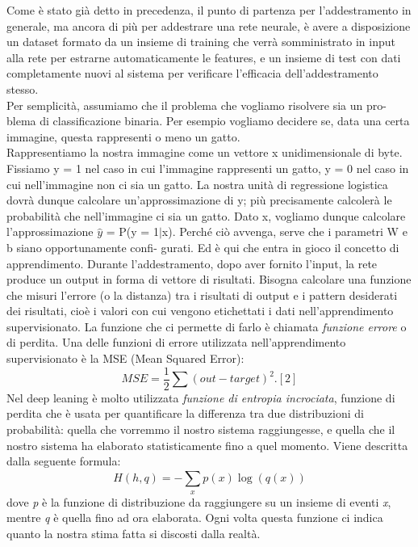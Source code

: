 Come è stato già detto in precedenza, il punto di partenza per l’addestramento in generale, ma ancora di più per addestrare una rete neurale, 
è avere a disposizione un dataset formato da un insieme di training che verrà somministrato in
 input alla rete per estrarne automaticamente le features, e un insieme di test con dati completamente nuovi al sistema
  per verificare l'efficacia dell’addestramento stesso. \\
  Per semplicità, assumiamo che il problema che vogliamo risolvere sia un pro-
blema di classificazione binaria. Per esempio vogliamo decidere se, data una certa
immagine, questa rappresenti o meno un gatto.\\
Rappresentiamo la nostra immagine come un vettore x unidimensionale di byte.
Fissiamo y = 1 nel caso in cui l’immagine rappresenti un gatto, y = 0 nel caso in
cui nell’immagine non ci sia un gatto. La nostra unità di regressione logistica dovrà
dunque calcolare un’approssimazione di y; più precisamente calcolerà le probabilità
che nell’immagine ci sia un gatto.
Dato x, vogliamo dunque calcolare l'approssimazione 
$\hat{y}$ = P(y = 1$\mid$x). 
Perché ciò avvenga, serve che i parametri W e b siano opportunamente confi-
gurati. Ed è qui che entra in gioco il concetto di apprendimento.
  Durante l’addestramento, dopo aver fornito l'input,
   la rete produce un output in forma di
vettore di risultati. Bisogna calcolare una funzione che misuri l’errore (o la distanza) tra i
 risultati di output e i pattern desiderati dei risultati, cioè i valori con cui vengono etichettati i 
 dati nell’apprendimento supervisionato.
  La funzione che ci permette di farlo è chiamata \emph{funzione errore} o di perdita.
   Una delle funzioni di errore utilizzata nell’apprendimento supervisionato è la MSE (Mean Squared Error):
\[MSE = \frac{1}{2}\sum (out - target)^{2}.        [2]\]
 Nel deep leaning è molto utilizzata \emph{funzione di entropia incrociata}, 
funzione di perdita che è usata per quantificare la differenza tra due distribuzioni di probabilità:
 quella che vorremmo il nostro sistema raggiungesse, e quella che il nostro sistema ha elaborato statisticamente
 fino a quel momento. Viene descritta dalla seguente formula:
 \[ H(h,q) = -\sum_{x}^{}p(x) \log (q(x))\] 
 dove \emph{p} è la funzione di distribuzione da raggiungere su un insieme di eventi \emph{x}, mentre \emph{q} 
 è quella fino ad ora elaborata. 
 Ogni volta questa funzione ci indica quanto la nostra stima fatta si discosti dalla realtà.\\

